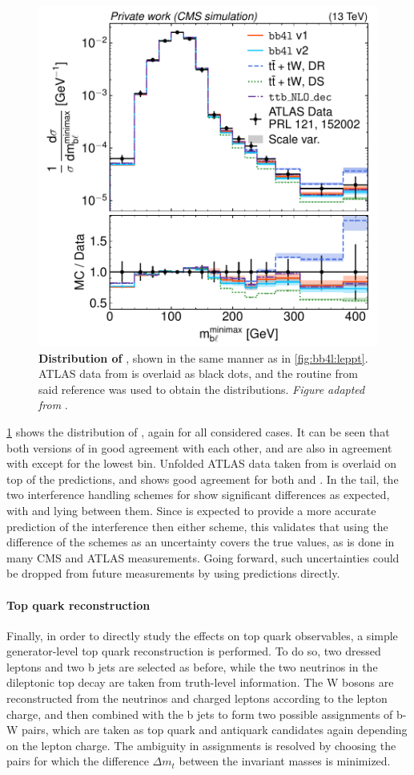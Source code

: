 \begin{figure}[tp]
    \centering
    \includegraphics[width=0.49 \textwidth]{figures/bb4l/generators/ATLAS_2018_I1677498_d03-x01-y01.pdf}
    \caption{\textbf{Distribution of \mblminimax}, shown in the same manner as in \cref{fig:bb4l:leppt}. ATLAS data from  is overlaid as black dots, and the \rivet routine from said reference was used to obtain the distributions. \textit{Figure adapted from }.}
    \label{fig:bb4l:mbl}
\end{figure}

\cref{fig:bb4l:mbl} shows the distribution of \mblminimax, again for all considered cases. It can be seen that both versions of \bbfourl in good agreement with each other, and are also in agreement with \ttb except for the lowest bin. Unfolded ATLAS data taken from  is overlaid on top of the predictions, and shows good agreement for both \bbfourl and \ttb. 
In the tail, the two interference handling schemes for \tttWsum show significant differences as expected, with \bbfourl and \ttb lying between them. Since \bbfourl is expected to provide a more accurate prediction of the interference then either scheme, this validates that using the difference of the schemes as an uncertainty covers the true values, as is done in many CMS and ATLAS measurements. Going forward, such uncertainties could be dropped from future measurements by using \bbfourl predictions directly.

\paragraph{Top quark reconstruction} Finally, in order to directly study the effects on top quark observables, a simple generator-level top quark reconstruction is performed. To do so, two dressed leptons and two b jets are selected as before, while the two neutrinos in the dileptonic top decay are taken from truth-level information. The W bosons are reconstructed from the neutrinos and charged leptons according to the lepton charge, and then combined with the b jets to form two possible assignments of b-W pairs, which are taken as top quark and antiquark candidates again depending on the lepton charge. The ambiguity in assignments is resolved by choosing the pairs for which the difference $\Delta m_t$ between the invariant masses is minimized. 

